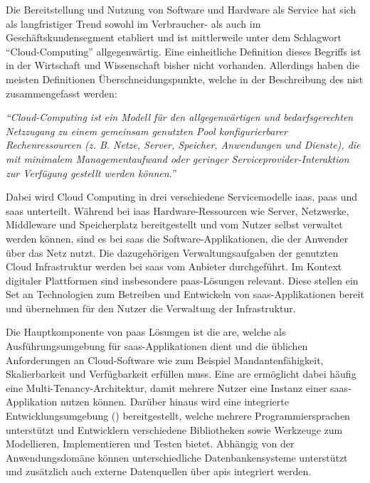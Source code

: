 Die Bereitstellung und Nutzung von Software und Hardware als Service hat sich als langfristiger Trend sowohl im Verbraucher- als auch im Geschäftskundensegment etabliert und ist mittlerweile unter dem Schlagwort \enquote{Cloud-Computing} allgegenwärtig. Eine einheitliche Definition dieses Begriffs ist in der Wirtschaft und Wissenschaft bisher nicht vorhanden. Allerdings haben die meisten Definitionen Überschneidungspunkte, welche in der Beschreibung des \ac{nist} zusammengefasst werden: 

\begin{center}
    \textit{\enquote{Cloud-Computing ist ein Modell für den allgegenwärtigen und bedarfsgerechten Netzzugang zu einem gemeinsam genutzten Pool konfigurierbarer Rechenressourcen (z. B. Netze, Server, Speicher, Anwendungen und Dienste), die mit minimalem Managementaufwand oder geringer Serviceprovider-Interaktion zur Verfügung gestellt werden können.}} \autocite[S. 2]{MELL2011}
\end{center}

Dabei wird Cloud Computing in drei verschiedene Servicemodelle \ac{iaas}, \ac{paas} und \ac{saas} unterteilt. Während bei \ac{iaas} Hardware-Ressourcen wie Server, Netzwerke, Middleware und Speicherplatz bereitgestellt und vom Nutzer selbst verwaltet werden können, sind es bei \ac{saas} die Software-Applikationen, die der Anwender über das Netz nutzt. Die dazugehörigen Verwaltungsaufgaben der genutzten Cloud Infrastruktur werden bei \ac{saas} vom Anbieter durchgeführt. Im Kontext digitaler Plattformen sind insbesondere \ac{paas}-Lösungen relevant.\autocite[Vgl.][S. 2f]{MELL2011} Diese stellen ein Set an Technologien zum Betreiben und Entwickeln von \ac{saas}-Applikationen bereit und übernehmen für den Nutzer die Verwaltung der Infrastruktur.\autocite[Vgl.][S. 8]{BRAUNINGER2012}

Die Hauptkomponente von \ac{paas} Lösungen ist die \ac{are}, welche als Ausführungsumgebung für \ac{saas}-Applikationen dient und die üblichen Anforderungen an Cloud-Software wie zum Beispiel Mandantenfähigkeit, Skalierbarkeit und Verfügbarkeit erfüllen muss. Eine \ac{are} ermöglicht dabei häufig eine Multi-Tenancy-Architektur, damit mehrere Nutzer eine Instanz einer \ac{saas}-Applikation nutzen können. Darüber hinaus wird eine integrierte Entwicklungsumgebung () bereitgestellt, welche mehrere Programmiersprachen unterstützt und Entwicklern verschiedene Bibliotheken sowie Werkzeuge zum Modellieren, Implementieren und Testen bietet. Abhängig von der Anwendungsdomäne können unterschiedliche Datenbankensysteme unterstützt und zusätzlich auch externe Datenquellen über \acp{api} integriert werden. \autocite[Vgl.][S. 371]{BEIMBORN2011}

